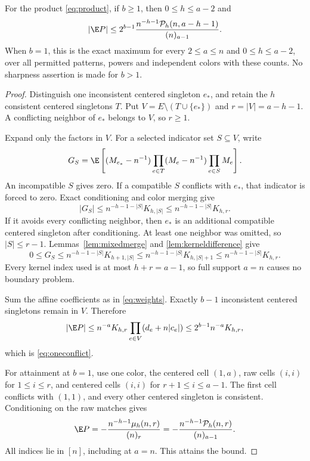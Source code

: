 \begin{theorem}\label{thm:oneconflict}
For the product \eqref{eq:product}, if $b\ge1$, then $0\le h\le a-2$ and
\begin{equation}\label{eq:oneconflict}
|\E P|\le
2^{b-1}\frac{n^{-h-1}\mathcal P_h(n,a-h-1)}{(n)_{a-1}}.
\end{equation}
When $b=1$, this is the exact maximum for every $2\le a\le n$ and $0\le h\le a-2$, over all permitted patterns, powers and independent colors with these counts. No sharpness assertion is made for $b>1$.
\end{theorem}
\begin{proof}
Distinguish one inconsistent centered singleton $e_*$, and retain the $h$ consistent centered singletons $T$. Put $V=E\setminus(T\cup\{e_*\})$ and $r=|V|=a-h-1$. A conflicting neighbor of $e_*$ belongs to $V$, so $r\ge1$.

Expand only the factors in $V$. For a selected indicator set $S\subseteq V$, write
\[
G_S=\E\left[(M_{e_*}-n^{-1})
\prod_{e\in T}(M_e-n^{-1})\prod_{e\in S}M_e\right].
\]
An incompatible $S$ gives zero. If a compatible $S$ conflicts with $e_*$, that indicator is forced to zero. Exact conditioning and color merging give
\[
|G_S|\le n^{-h-1-|S|}K_{h,|S|}\le n^{-h-1-|S|}K_{h,r}.
\]
If it avoids every conflicting neighbor, then $e_*$ is an additional compatible centered singleton after conditioning. At least one neighbor was omitted, so $|S|\le r-1$. Lemmas~\ref{lem:mixedmerge} and \ref{lem:kerneldifference} give
\[
0\le G_S\le n^{-h-1-|S|}K_{h+1,|S|}
\le n^{-h-1-|S|}K_{h,|S|+1}
\le n^{-h-1-|S|}K_{h,r}.
\]
Every kernel index used is at most $h+r=a-1$, so full support $a=n$ causes no boundary problem.

Sum the affine coefficients as in \eqref{eq:weights}. Exactly $b-1$ inconsistent centered singletons remain in $V$. Therefore
\[
|\E P|\le n^{-a}K_{h,r}
\prod_{e\in V}(d_e+n|c_e|)
\le2^{b-1}n^{-a}K_{h,r},
\]
which is \eqref{eq:oneconflict}.

For attainment at $b=1$, use one color, the centered cell $(1,a)$, raw cells $(i,i)$ for $1\le i\le r$, and centered cells $(i,i)$ for $r+1\le i\le a-1$. The first cell conflicts with $(1,1)$, and every other centered singleton is consistent. Conditioning on the raw matches gives
\[
\E P=-\frac{n^{-h-1}\mu_h(n,r)}{(n)_r}
=-\frac{n^{-h-1}\mathcal P_h(n,r)}{(n)_{a-1}}.
\]
All indices lie in $[n]$, including at $a=n$. This attains the bound.
\end{proof}

